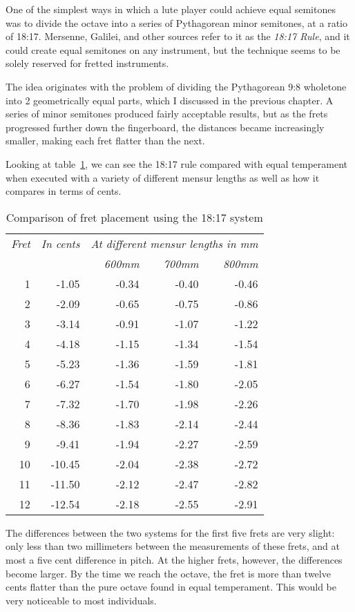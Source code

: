 One of the simplest ways in which a lute player could achieve equal semitones was to
divide the octave into a series of Pythagorean minor semitones, at a ratio of 18:17.
Mersenne, Galilei, and other sources refer to it as the \textit{18:17 Rule}, and it
could create equal semitones on any instrument, but the technique seems to be solely
reserved for fretted instruments.

The idea originates with the problem of dividing the Pythagorean 9:8 wholetone into 2 geometrically equal parts,
which I discussed in the previous chapter. A series of minor semitones produced fairly acceptable
results, but as the frets progressed further down the fingerboard, the distances became increasingly
smaller, making each fret flatter than the next.

Looking at table~\ref{18:17rule}, we can see the 18:17 rule compared with equal temperament
when executed with a variety of different mensur lengths as well as how it
compares in terms of cents.
\begin{table}[h!]
  \begin{center}
  \begin{tabular}{ r r| r r r }
   \textit{Fret} & \textit{In cents} & \multicolumn{3}{c}{\textit{At different mensur lengths in mm}} \\
    & & \textit{600mm} & \textit{700mm} & \textit{800mm} \\
   \hline
   1 & -1.05 & -0.34 & -0.40 & -0.46 \\
   2 & -2.09 & -0.65 & -0.75 & -0.86 \\
   3 & -3.14 & -0.91 & -1.07 & -1.22 \\
   4 & -4.18 & -1.15 & -1.34 & -1.54 \\
   5 & -5.23 & -1.36 & -1.59 & -1.81 \\
   6 & -6.27 & -1.54 & -1.80 & -2.05 \\
   7 & -7.32 & -1.70 & -1.98 & -2.26 \\
   8 & -8.36 & -1.83 & -2.14 & -2.44 \\
   9 & -9.41 & -1.94 & -2.27 & -2.59 \\
   10 & -10.45 & -2.04 & -2.38 & -2.72 \\
   11 & -11.50 & -2.12 & -2.47 & -2.82 \\
   12 & -12.54 & -2.18 & -2.55 & -2.91 \\
  \end{tabular}
  \end{center}
  \caption{Comparison of fret placement using the 18:17 system}
  \label{18:17rule}
\end{table}
The differences between the two systems for the first five frets are very slight: only
less than two millimeters between the measurements of these frets,
and at most a five cent difference in pitch. At the higher frets, however, the
differences become larger. By the time we reach the octave, the fret is more than
twelve cents flatter than the pure octave found in equal temperament. This would be
very noticeable to most individuals.

